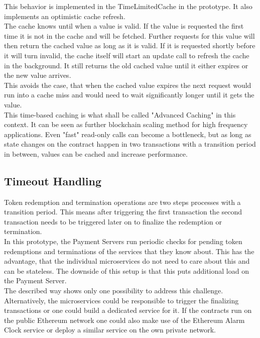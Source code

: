 \documentclass[a4paper,12pt]{scrartcl}
\begin{document}
This behavior is implemented in the TimeLimitedCache in the prototype. It also implements an optimistic cache refresh.\\
The cache knows until when a value is valid. If the value is requested the first time it is not in the cache and will be fetched. Further requests for this value will then return the cached value as long as it is valid. If it is requested shortly before it will turn invalid, the cache itself will start an update call to refresh the cache in the background. It still returns the old cached value until it either expires or the new value arrives.\\
This avoids the case, that when the cached value expires the next request would run into a cache miss and would need to wait significantly longer until it gets the value.\\

This time-based caching is what shall be called "Advanced Caching" in this context. It can be seen as further blockchain scaling method for high frequency applications. Even "fast" read-only calls can become a bottleneck, but as long as state changes on the contract happen in two transactions with a transition period in between, values can be cached and increase performance.

\subsection{Timeout Handling}

Token redemption and termination operations are two steps processes with a transition period. This means after triggering the first transaction the second transaction needs to be triggered later on to finalize the redemption or termination.\\

In this prototype, the Payment Servers run periodic checks for pending token redemptions and terminations of the services that they know about. This has the advantage, that the individual microservices do not need to care about this and can be stateless. The downside of this setup is that this puts additional load on the Payment Server.\\

The described way shows only one possibility to address this challenge. Alternatively, the microservices could be responsible to trigger the finalizing transactions or one could build a dedicated service for it. If the contracts run on the public Ethereum network one could also make use of the Ethereum Alarm Clock service \cite{web56} or deploy a similar service on the own private network.\\
\end{document}
